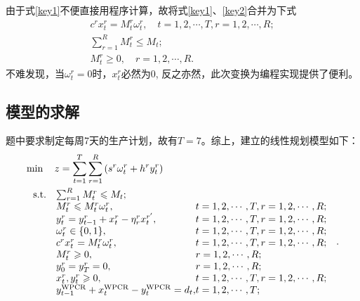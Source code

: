 	由于式\ref{key1}不便直接用程序计算，故将式\ref{key1}、\ref{key2}合并为下式
	\begin{equation}
		\begin{array}{c}
c^{r} x_{t}^{r}=M_{t}^{r} \omega_{t}^{r}, \quad t=1,2, \cdots, T, r=1,2, \cdots, R; \\
\sum_{r=1}^{R} M_{t}^{r} \leqslant M_{t}; \\
M_{t}^{r} \geqslant 0,\quad  r=1,2, \cdots, R.
\end{array}
	\end{equation}
	不难发现，当$\omega_{t}^{r} = 0$时，$x_{t}^{r}$必然为0, 反之亦然，此次变换为编程实现提供了便利。


\subsection{模型的求解} %
\label{sub:模型的求解}

题中要求制定每周7天的生产计划，故有$T = 7$。综上，建立的线性规划模型如下：
\begin{equation}
	\begin{aligned}
&\min \quad z  = \sum_{t  = 1}^{T} \sum_{r = 1}^{R}\left(s^{r} \omega_{t}^{r}+h^{r} y_{t}^{r}\right)\\
& \ \begin{array}{r@{\quad}l@{}l@{\quad}l}
\mathrm{s.t. } 	&\sum_{r=1}^{R} M_{t}^{r} \leqslant M_{t}; &\\
&M_{t}^{r} \leqslant M_{t}^{r} \omega_{t}^{r}, &t=1,2, \cdots, T, r=1,2, \cdots, R;\\
& y_{t}^{r}=y_{t-1}^{r}+x_{t}^{r}-\eta_{r}^{r} x_{t}^{r^{\prime}}, &t=1,2, \cdots, T,  r=1,2, \cdots, R; \\
&\omega_{t}^{r} \in\{0,1\}, &t=1,2, \cdots, T, r=1,2, \cdots, R; \\
&c^{r} x_{t}^{r}=M_{t}^{r} \omega_{t}^{r}, &t=1,2, \cdots, T, r=1,2, \cdots, R; \\
&M_{t}^{r} \geqslant 0,& r=1,2, \cdots, R ;\\
&y_{0}^{r}=y_{T}^{r}=0,& r=1,2, \cdots, R ;\\
&x_{t}^{r}, y_{t}^{r} \geqslant 0, &t=1,2, \cdots, T, r=1,2, \cdots, R;\\
&y_{t-1}^{\mathrm{WPCR}}+x_{t}^{\mathrm{WPCR}}-y_{t}^{\mathrm{WPCR}}=d_{t}, & t=1,2, \cdots, T; \\
\end{array}.
\end{aligned}
\end{equation}



